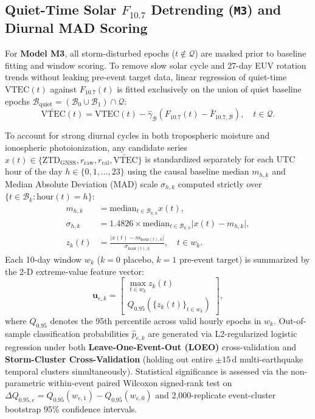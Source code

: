 ﻿\documentclass[journal]{IEEEtran}
\begin{document}
\subsection{Quiet-Time Solar $F_{10.7}$ Detrending (\texttt{M3}) and Diurnal MAD Scoring}
For \textbf{Model M3}, all storm-disturbed epochs ($t \notin \mathcal{Q}$) are masked prior to baseline fitting and window scoring. To remove slow solar cycle and 27-day EUV rotation trends without leaking pre-event target data, linear regression of quiet-time $\text{VTEC}(t)$ against $F_{10.7}(t)$ is fitted exclusively on the union of quiet baseline epochs $\mathcal{B}_{\text{quiet}} = (\mathcal{B}_0 \cup \mathcal{B}_1) \cap \mathcal{Q}$:
\begin{equation}
    \widetilde{\text{VTEC}}(t) = \text{VTEC}(t) - \hat{\gamma}_{\mathcal{B}} \left(F_{10.7}(t) - \bar{F}_{10.7,\mathcal{B}}\right), \quad t \in \mathcal{Q}.
    \label{eq:vtec_detrend}
\end{equation}

To account for strong diurnal cycles in both tropospheric moisture and ionospheric photoionization, any candidate series $x(t) \in \{\text{ZTD}_{\text{GNSS}}, r_{\text{raw}}, r_{\text{cal}}, \widetilde{\text{VTEC}}\}$ is standardized separately for each UTC hour of the day $h \in \{0, 1, \dots, 23\}$ using the causal baseline median $m_{h,k}$ and Median Absolute Deviation ($\text{MAD}$) scale $\sigma_{h,k}$ computed strictly over $\{t \in \mathcal{B}_k : \text{hour}(t) = h\}$:
\begin{align}
    m_{h,k} &= \text{median}_{t \in \mathcal{B}_{k,h}} x(t), \label{eq:med} \\
    \sigma_{h,k} &= 1.4826 \times \text{median}_{t \in \mathcal{B}_{k,h}} \lvert x(t) - m_{h,k} \rvert, \label{eq:mad} \\
    z_k(t) &= \frac{\lvert x(t) - m_{\text{hour}(t),k} \rvert}{\sigma_{\text{hour}(t),k}}, \quad t \in w_k. \label{eq:zscore}
\end{align}
Each 10-day window $w_k$ ($k=0$ placebo, $k=1$ pre-event target) is summarized by the 2-D extreme-value feature vector:
\begin{equation}
    \mathbf{u}_{e,k} = \begin{bmatrix} \max_{t \in w_k} z_k(t) \\ Q_{0.95}\!\left(\{z_k(t)\}_{t \in w_k}\right) \end{bmatrix},
    \label{eq:feat_vec}
\end{equation}
where $Q_{0.95}$ denotes the 95th percentile across valid hourly epochs in $w_k$. Out-of-sample classification probabilities $\hat{p}_{e,k}$ are generated via L2-regularized logistic regression under both \textbf{Leave-One-Event-Out (LOEO)} cross-validation and \textbf{Storm-Cluster Cross-Validation} (holding out entire $\pm 15\,\text{d}$ multi-earthquake temporal clusters simultaneously). Statistical significance is assessed via the non-parametric within-event paired Wilcoxon signed-rank test on $\Delta Q_{0.95,e} = Q_{0.95}(w_{e,1}) - Q_{0.95}(w_{e,0})$ and 2,000-replicate event-cluster bootstrap 95\% confidence intervals.
\end{document}
